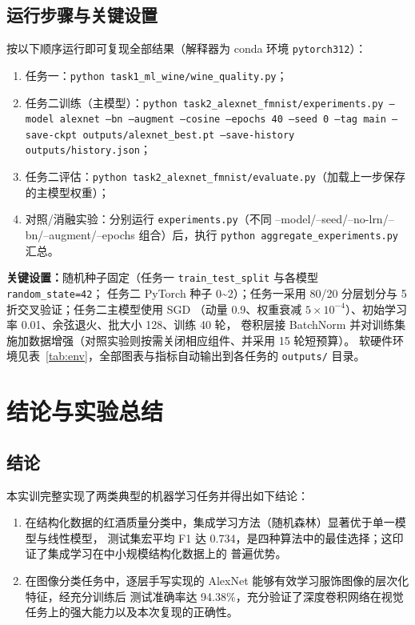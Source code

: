 \documentclass[12pt,a4paper,fontset=fandol]{ctexart}   %
\numberwithin{figure}{section}
\numberwithin{table}{section}
\numberwithin{equation}{section}
\begin{document}
\subsection{运行步骤与关键设置}
按以下顺序运行即可复现全部结果（解释器为 conda 环境 \texttt{pytorch312}）：
\begin{enumerate}[label=（\arabic*）,leftmargin=3em]
  \item 任务一：\texttt{python task1\_ml\_wine/wine\_quality.py}；
  \item 任务二训练（主模型）：\texttt{python task2\_alexnet\_fmnist/experiments.py --model alexnet
  --bn --augment --cosine --epochs 40 --seed 0 --tag main --save-ckpt outputs/alexnet\_best.pt
  --save-history outputs/history.json}；
  \item 任务二评估：\texttt{python task2\_alexnet\_fmnist/evaluate.py}（加载上一步保存的主模型权重）；
  \item 对照/消融实验：分别运行 \texttt{experiments.py}（不同 --model/--seed/--no-lrn/--bn/--augment/--epochs
  组合）后，执行 \texttt{python aggregate\_experiments.py} 汇总。
\end{enumerate}
\textbf{关键设置：}随机种子固定（任务一 \texttt{train\_test\_split} 与各模型 \texttt{random\_state=42}；
任务二 PyTorch 种子 0\textasciitilde2）；任务一采用 80/20 分层划分与 5 折交叉验证；任务二主模型使用 SGD
（动量 0.9、权重衰减 $5\times10^{-4}$）、初始学习率 0.01、余弦退火、批大小 128、训练 40 轮，
卷积层接 BatchNorm 并对训练集施加数据增强（对照实验则按需关闭相应组件、并采用 15 轮短预算）。
软硬件环境见表~\ref{tab:env}，全部图表与指标自动输出到各任务的 \texttt{outputs/} 目录。

\section{结论与实验总结}

\subsection{结论}
本实训完整实现了两类典型的机器学习任务并得出如下结论：
\begin{enumerate}[label=（\arabic*）,leftmargin=3em]
  \item 在结构化数据的红酒质量分类中，集成学习方法（随机森林）显著优于单一模型与线性模型，
  测试集宏平均 F1 达 0.734，是四种算法中的最佳选择；这印证了集成学习在中小规模结构化数据上的
  普遍优势。
  \item 在图像分类任务中，逐层手写实现的 AlexNet 能够有效学习服饰图像的层次化特征，经充分训练后
  测试准确率达 94.38\%，充分验证了深度卷积网络在视觉任务上的强大能力以及本次复现的正确性。
\end{enumerate}
\end{document}
